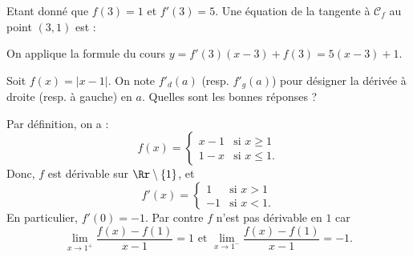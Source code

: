 \begin{question}

Etant donné que $\displaystyle f(3)=1$ et $f'(3)=5$. Une équation de la tangente à $\mathcal{C}_f$ au point $(3,1)$ est :
\begin{answers}  
\end{answers}
\begin{explanations}
On applique la formule du cours $\displaystyle y=f'(3)(x-3)+f(3)=5(x-3)+1$.
\end{explanations}
\end{question}



\begin{question}

Soit $\displaystyle f(x)=|x-1|$. On note $f'_d(a)$ (resp. $f'_g(a)$) pour désigner la dérivée à droite (resp. à gauche) en $a$. Quelles sont les bonnes réponses ?
\begin{answers}  
\end{answers}
\begin{explanations}
Par définition, on a :
$$f(x)=\left\{ \begin{array}{ll}x-1&\mbox{si }x\geq 1\\ 1-x&\mbox{si }x\leq 1.
\end{array}\right.$$
Donc, $f$ est dérivable sur $\Rr\setminus\{1\}$, et
$$f'(x)=\left\{ \begin{array}{ll}1&\mbox{si }x> 1\\ -1&\mbox{si }x< 1.
\end{array}\right.$$
En particulier, $f'(0)=-1$. Par contre $f$ n'est pas dérivable en $1$ car
$$\lim _{x\to 1^+}\frac{f(x)-f(1)}{x-1}=1 \mbox{ et }\lim _{x\to 1^-}\frac{f(x)-f(1)}{x-1}=-1.$$
\end{explanations}
\end{question}




